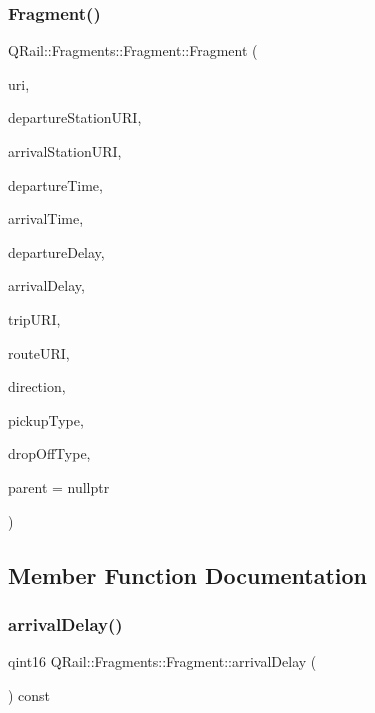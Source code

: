 \subsubsection{\texorpdfstring{Fragment()}{Fragment()}\hspace{0.1cm}{\footnotesize\ttfamily [2/2]}}
{\footnotesize\ttfamily Q\+Rail\+::\+Fragments\+::\+Fragment\+::\+Fragment (\begin{DoxyParamCaption}\item[{const Q\+Url \&}]{uri,  }\item[{const Q\+Url \&}]{departure\+Station\+U\+RI,  }\item[{const Q\+Url \&}]{arrival\+Station\+U\+RI,  }\item[{const Q\+Date\+Time \&}]{departure\+Time,  }\item[{const Q\+Date\+Time \&}]{arrival\+Time,  }\item[{const qint16 \&}]{departure\+Delay,  }\item[{const qint16 \&}]{arrival\+Delay,  }\item[{const Q\+Url \&}]{trip\+U\+RI,  }\item[{const Q\+Url \&}]{route\+U\+RI,  }\item[{const Q\+String \&}]{direction,  }\item[{const \mbox{\hyperlink{classQRail_1_1Fragments_1_1Fragment_ae3c308ba6dec16f36ecc5dba59f35af3}{G\+T\+F\+S\+Types}} \&}]{pickup\+Type,  }\item[{const \mbox{\hyperlink{classQRail_1_1Fragments_1_1Fragment_ae3c308ba6dec16f36ecc5dba59f35af3}{G\+T\+F\+S\+Types}} \&}]{drop\+Off\+Type,  }\item[{Q\+Object $\ast$}]{parent = {\ttfamily nullptr} }\end{DoxyParamCaption})\hspace{0.3cm}{\ttfamily [explicit]}}



\subsection{Member Function Documentation}
\mbox{\label{classQRail_1_1Fragments_1_1Fragment_a0f5ee06943c6cf1dc3ba0e98439e4262}} 
\subsubsection{\texorpdfstring{arrivalDelay()}{arrivalDelay()}}
{\footnotesize\ttfamily qint16 Q\+Rail\+::\+Fragments\+::\+Fragment\+::arrival\+Delay (\begin{DoxyParamCaption}{ }\end{DoxyParamCaption}) const}

